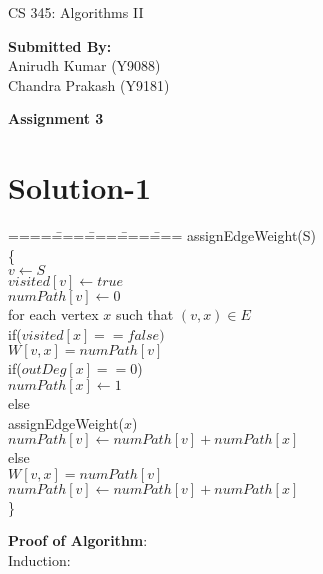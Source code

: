 \documentclass[a4paper,10pt]{article}
\begin{document}
\begin{center}{\Huge CS 345: Algorithms II}\\
\begin{flushright}
\textbf{Submitted By:}\\
Anirudh Kumar (Y9088)\\
Chandra Prakash (Y9181)
\end{flushright}
\LARGE \textbf{Assignment 3}\\
\end{center}
\normalsize
\section{Solution-1}
\begin{tabbing}
====\====\====\====\====\kill
assignEdgeWeight(S)\\
\{\\
\>$v\leftarrow S$\>\\
\>$visited[v]\leftarrow true$\\
\>$numPath[v]\leftarrow 0$\\
\>for each vertex $x$ such that $(v,x)\in E$\\
\>\>if($visited[x]==false)$\\
\>\>\>$W[v,x] = numPath[v]$\\
\>\>\>if($outDeg[x]==0$)\\
\>\>\>\>$numPath[x] \leftarrow 1$\\
\>\>\>else\\
\>\>\>\>assignEdgeWeight($x$)\\
\>\>\>$numPath[v] \leftarrow numPath[v]+numPath[x]$\\
\>\>else\\
\>\>\>$W[v,x] = numPath[v]$\\
\>\>\>$numPath[v] \leftarrow numPath[v]+numPath[x]$\\
\}\\
\end{tabbing}
\textbf{Proof of Algorithm}:\\
Induction:\\
\end{document}
